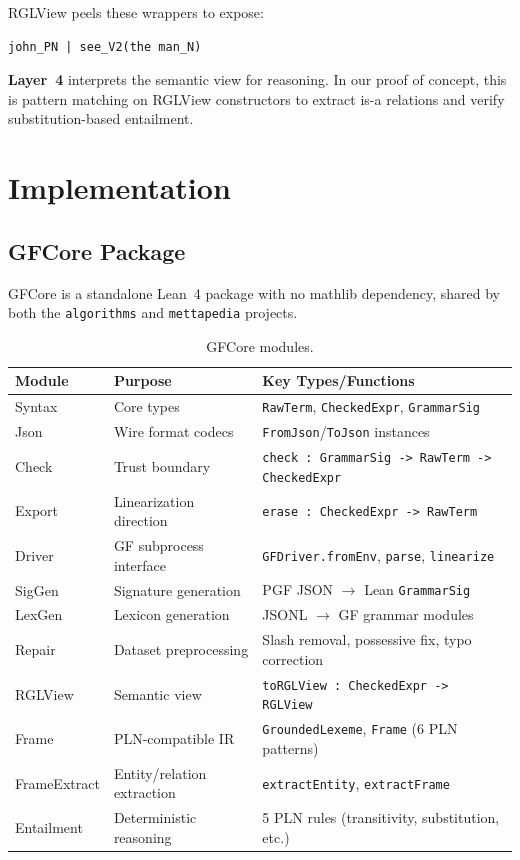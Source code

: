 \documentclass[]{article}
\newcommand{\code}[1]{\texttt{#1}}
\newcommand{\GFCore}{\textup{GFCore}}
\begin{document}
RGLView peels these wrappers to expose:

\begin{lstlisting}
john_PN | see_V2(the man_N)
\end{lstlisting}

\textbf{Layer~4} interprets the semantic view for reasoning. In our
proof of concept, this is pattern matching on RGLView constructors
to extract is-a relations and verify substitution-based entailment.

\section{Implementation}
\label{sec:implementation}

\subsection{GFCore Package}

\GFCore{} is a standalone Lean~4 package with no mathlib dependency,
shared by both the \code{algorithms} and \code{mettapedia} projects.

\begin{table}[h]
\centering
\begin{tabular}{lll}
\toprule
\textbf{Module} & \textbf{Purpose} & \textbf{Key Types/Functions} \\
\midrule
Syntax   & Core types & \code{RawTerm}, \code{CheckedExpr}, \code{GrammarSig} \\
Json     & Wire format codecs & \code{FromJson}/\code{ToJson} instances \\
Check    & Trust boundary & \code{check : GrammarSig -> RawTerm -> CheckedExpr} \\
Export   & Linearization direction & \code{erase : CheckedExpr -> RawTerm} \\
Driver   & GF subprocess interface & \code{GFDriver.fromEnv}, \code{parse}, \code{linearize} \\
SigGen   & Signature generation & PGF JSON $\to$ Lean \code{GrammarSig} \\
LexGen   & Lexicon generation & JSONL $\to$ GF grammar modules \\
Repair   & Dataset preprocessing & Slash removal, possessive fix, typo correction \\
RGLView  & Semantic view & \code{toRGLView : CheckedExpr -> RGLView} \\
Frame    & PLN-compatible IR & \code{GroundedLexeme}, \code{Frame} (6 PLN patterns) \\
FrameExtract & Entity/relation extraction & \code{extractEntity}, \code{extractFrame} \\
Entailment & Deterministic reasoning & 5 PLN rules (transitivity, substitution, etc.) \\
\bottomrule
\end{tabular}
\caption{\GFCore{} modules.}
\label{tab:modules}
\end{table}
\end{document}
